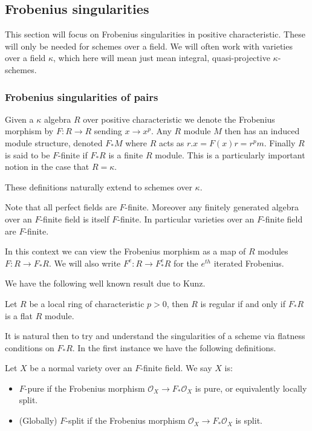 \documentclass[a4paper,12pt]{book}
\newcommand{\ox}[1][X]{\mathcal{O}_{#1}}
\begin{document}
\subsection{Frobenius singularities}

This section will focus on Frobenius singularities in positive characteristic. These will only be needed for schemes over a field. We will often work with varieties over a field $\kappa$, which here will mean just mean integral, quasi-projective $\kappa$-schemes.

\subsubsection{Frobenius singularities of pairs}

\begin{definition}
Given a $\kappa$ algebra $R$ over positive characteristic we denote the Frobenius morphism by $F:R\to R$ sending $x \to x^{p}$. Any $R$ module $M$ then has an induced module structure, denoted $F_{*}M$ where $R$ acts as $r.x=F(x)r=r^{p}m$. Finally $R$ is said to be $F$-finite if $F_{*}R$ is a finite $R$ module. This is a particularly important notion in the case that $R=\kappa$.

These definitions naturally extend to schemes over $\kappa$. 
\end{definition}

Note that all perfect fields are $F$-finite. Moreover any finitely generated algebra over an $F$-finite field is itself $F$-finite. In particular varieties over an $F$-finite field are $F$-finite.

In this context we can view the Frobenius morphism as a map of $R$ modules $F:R \to F_{*}R$. We will also write $F^{e}:R \to F_{*}^{e}R$ for the $e^{th}$ iterated Frobenius.

We have the following well known result due to Kunz.

\begin{theorem}
	Let $R$ be a local ring of characteristic $p> 0$, then $R$ is regular if and only if $F_{*}R$ is a flat $R$ module.
\end{theorem}

It is natural then to try and understand the singularities of a scheme via flatness conditions on $F_{*}R$. In the first instance we have the following definitions.

\begin{definition}
	Let $X$ be a normal variety over an $F$-finite field.
	We say $X$ is:
	\begin{itemize}
		\item $F$-pure if the Frobenius morphism $\ox \to F_{*}\ox$ is pure, or equivalently locally split.
		\item (Globally) $F$-split if the Frobenius morphism $\ox \to F_{*}\ox$ is split.
	\end{itemize} 
\end{definition}
\end{document}
